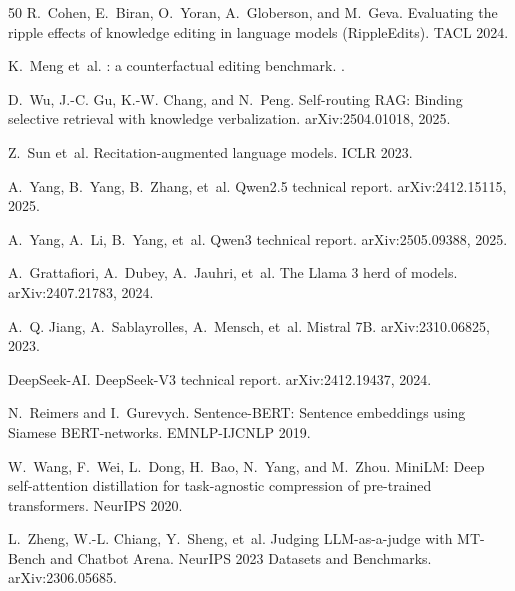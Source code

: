 \documentclass[11pt]{article}
\begin{document}
\begin{thebibliography}{50}
R.~Cohen, E.~Biran, O.~Yoran, A.~Globerson, and M.~Geva.
\newblock Evaluating the ripple effects of knowledge editing in language
  models ({RippleEdits}).
\newblock TACL 2024.

K.~Meng et~al.
: a counterfactual editing benchmark.
.

D.~Wu, J.-C. Gu, K.-W. Chang, and N.~Peng.
\newblock Self-routing {RAG}: Binding selective retrieval with knowledge
  verbalization.
\newblock arXiv:2504.01018, 2025.

Z.~Sun et~al.
\newblock Recitation-augmented language models.
\newblock ICLR 2023.

A.~Yang, B.~Yang, B.~Zhang, et~al.
\newblock Qwen2.5 technical report.
\newblock arXiv:2412.15115, 2025.

A.~Yang, A.~Li, B.~Yang, et~al.
\newblock Qwen3 technical report.
\newblock arXiv:2505.09388, 2025.

A.~Grattafiori, A.~Dubey, A.~Jauhri, et~al.
\newblock The Llama 3 herd of models.
\newblock arXiv:2407.21783, 2024.

A.~Q. Jiang, A.~Sablayrolles, A.~Mensch, et~al.
\newblock Mistral 7B.
\newblock arXiv:2310.06825, 2023.

DeepSeek-AI.
\newblock DeepSeek-V3 technical report.
\newblock arXiv:2412.19437, 2024.

N.~Reimers and I.~Gurevych.
\newblock Sentence-BERT: Sentence embeddings using Siamese BERT-networks.
\newblock EMNLP-IJCNLP 2019.

W.~Wang, F.~Wei, L.~Dong, H.~Bao, N.~Yang, and M.~Zhou.
\newblock MiniLM: Deep self-attention distillation for task-agnostic compression of pre-trained transformers.
\newblock NeurIPS 2020.

L.~Zheng, W.-L. Chiang, Y.~Sheng, et~al.
\newblock Judging LLM-as-a-judge with MT-Bench and Chatbot Arena.
\newblock NeurIPS 2023 Datasets and Benchmarks. arXiv:2306.05685.


\end{thebibliography}
\end{document}
